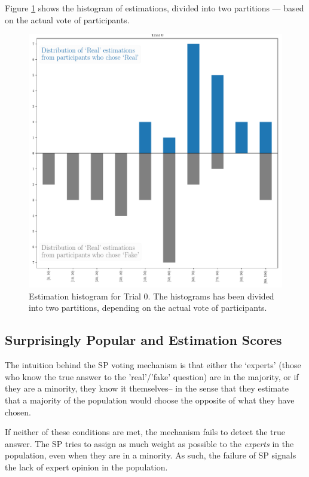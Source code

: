 \documentclass{report}
\theoremstyle{definition}
\begin{document}
Figure \ref{fig:exp1_estim_trial0} shows the histogram  of estimations, divided into two partitions --- based on the actual vote of participants.
\begin{figure}[H]
    \centering
    \includegraphics[width=\textwidth]{exp1_estim_trial0.pdf}
    \caption{Estimation histogram for Trial 0. The histograms has been divided into two partitions, depending on the actual vote of participants.}
    \label{fig:exp1_estim_trial0}
\end{figure}

\subsection{Surprisingly Popular and Estimation Scores}
The intuition behind the SP voting mechanism is that either the `experts' (those who know the true answer to the 'real'/'fake' question) are in the majority, or if they are a minority, they know it themselves-- in the sense that they estimate that a majority of the population would choose the opposite of what they have chosen.

If neither of these conditions are met, the mechanism fails to detect the true answer. The SP tries to assign as much weight as possible to the \emph{experts} in the population, even when they are in a minority. As such, the failure of SP signals the lack of expert opinion in the population. 
\end{document}
